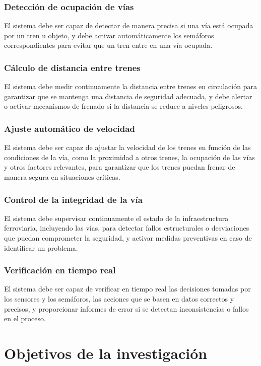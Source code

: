 \documentclass[journal]{IEEEtran}
\begin{document}
\subsubsection{Detección de ocupación de vías} 
El sistema debe ser capaz de detectar de manera precisa si una vía está ocupada por un tren u objeto, y debe activar automáticamente los semáforos correspondientes para evitar que un tren entre en una vía ocupada.

\subsubsection{Cálculo de distancia entre trenes} 
El sistema debe medir continuamente la distancia entre trenes en circulación para garantizar que se mantenga una distancia de seguridad adecuada, y debe alertar o activar mecanismos de frenado si la distancia se reduce a niveles peligrosos.

\subsubsection{Ajuste automático de velocidad} 
El sistema debe ser capaz de ajustar la velocidad de los trenes en función de las condiciones de la vía, como la proximidad a otros trenes, la ocupación de las vías y otros factores relevantes, para garantizar que los trenes puedan frenar de manera segura en situaciones críticas.

\subsubsection{Control de la integridad de la vía} 
El sistema debe supervisar continuamente el estado de la infraestructura ferroviaria, incluyendo las vías, para detectar fallos estructurales o desviaciones que puedan comprometer la seguridad, y activar medidas preventivas en caso de identificar un problema.

\subsubsection{Verificación en tiempo real} 
El sistema debe ser capaz de verificar en tiempo real las decisiones tomadas por los sensores y los semáforos, las acciones que se basen en datos correctos y precisos, y proporcionar informes de error si se detectan inconsistencias o fallos en el proceso.

\section{Objetivos de la investigación}  
\end{document}
